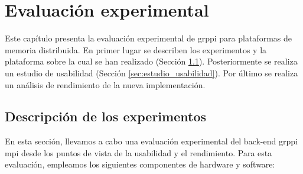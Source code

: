 \chead[]{}
\renewcommand{\headrulewidth}{0.5pt}

\lfoot[]{}
\cfoot[]{}
\rfoot[]{}
\renewcommand{\footrulewidth}{0pt}

\chapter{Evaluación experimental}
\label{ch:evaluacion_experimental}

Este capítulo presenta la evaluación experimental de \acrshort{grppi} para plataformas de memoria distribuida. En primer lugar se describen los experimentos y la plataforma sobre la cual se han realizado (Sección \ref{sec:descripcion_experimentos}). Posteriormente se realiza un estudio de usabilidad (Sección \ref{sec:estudio_usabilidad}). Por último se realiza un análisis de rendimiento de la nueva implementación.

\section{Descripción de los experimentos}
\label{sec:descripcion_experimentos}

En esta sección, llevamos a cabo una evaluación experimental del back-end \acrshort{grppi} \acrshort{mpi} desde los puntos de vista de la usabilidad y el rendimiento. Para esta evaluación, empleamos los siguientes componentes de hardware y software:

